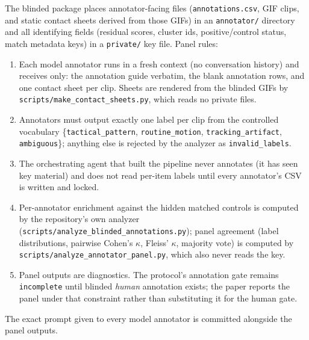 The blinded package places annotator-facing files (\texttt{annotations.csv},
GIF clips, and static contact sheets derived from those GIFs) in an
\texttt{annotator/} directory and all identifying fields (residual scores,
cluster ids, positive/control status, match metadata keys) in a
\texttt{private/} key file. Panel rules:

\begin{enumerate}
  \item Each model annotator runs in a fresh context (no conversation history)
  and receives only: the annotation guide verbatim, the blank annotation rows,
  and one contact sheet per clip. Sheets are rendered from the blinded GIFs by
  \texttt{scripts/make\_contact\_sheets.py}, which reads no private files.
  \item Annotators must output exactly one label per clip from the controlled
  vocabulary \{\texttt{tactical\_pattern}, \texttt{routine\_motion},
  \texttt{tracking\_artifact}, \texttt{ambiguous}\}; anything else is rejected
  by the analyzer as \texttt{invalid\_labels}.
  \item The orchestrating agent that built the pipeline never annotates (it has
  seen key material) and does not read per-item labels until every annotator's
  CSV is written and locked.
  \item Per-annotator enrichment against the hidden matched controls is
  computed by the repository's own analyzer
  (\texttt{scripts/analyze\_blinded\_annotations.py}); panel agreement (label
  distributions, pairwise Cohen's $\kappa$, Fleiss' $\kappa$, majority vote) is
  computed by \texttt{scripts/analyze\_annotator\_panel.py}, which also never
  reads the key.
  \item Panel outputs are diagnostics. The protocol's annotation gate remains
  \texttt{incomplete} until blinded \emph{human} annotation exists; the paper
  reports the panel under that constraint rather than substituting it for the
  human gate.
\end{enumerate}

The exact prompt given to every model annotator is committed alongside the
panel outputs.
